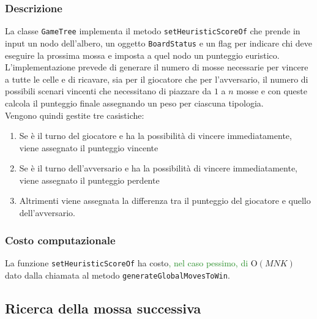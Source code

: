 \documentclass[11pt]{article}
\begin{document}
\subsubsection*{Descrizione}
La classe \texttt{GameTree} implementa il metodo \texttt{setHeuristicScoreOf} che prende in input un nodo dell'albero, un oggetto \texttt{BoardStatus} e un flag per indicare chi deve eseguire la prossima mossa e imposta a quel nodo un punteggio euristico.\\
L'implementazione prevede di generare il numero di mosse necessarie per vincere a tutte le celle e di ricavare, sia per il giocatore che per l'avversario, il numero di possibili scenari vincenti che necessitano di piazzare da $1$ a $n$ mosse e con queste calcola il punteggio finale assegnando un peso per ciascuna tipologia.\\
Vengono quindi gestite tre casistiche: 
\begin{enumerate}
\setlength\itemsep{0.05cm}
	\item Se è il turno del giocatore e ha la possibilità di vincere immediatamente, viene assegnato il punteggio vincente
	\item Se è il turno dell'avversario e ha la possibilità di vincere immediatamente, viene assegnato il punteggio perdente
	\item Altrimenti viene assegnata la differenza tra il punteggio del giocatore e quello dell'avversario.
\end{enumerate}
\subsubsection*{Costo computazionale}
La funzione \texttt{setHeuristicScoreOf} ha costo\textcolor{ForestGreen}{, nel caso pessimo, di} O$(MNK)$ dato dalla chiamata al metodo \texttt{generateGlobalMovesToWin}.

\subsection*{Ricerca della mossa successiva}
\end{document}
